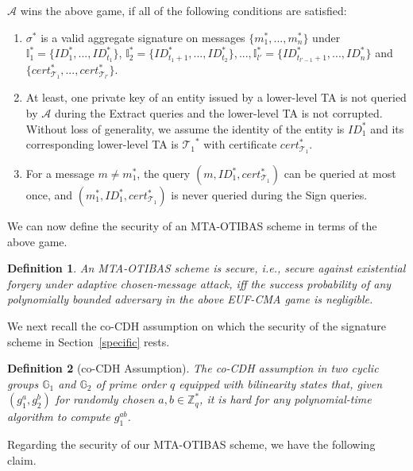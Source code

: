 \documentclass[10pt,journal,compsoc]{IEEEtran}
\newtheorem{definition}{Definition}
\begin{document}
\smallskip\noindent $\mathcal {A}$ wins the above game, if all of the
following conditions are satisfied:
\begin{enumerate}
  \item $\sigma^*$ is a valid aggregate signature on messages $\{m_1^*,...,m_n^*\}$
     under $\mathbb{I}_1^*=\{ID_1^*,...,ID_{t_1}^*\}$,
$\mathbb{I}_2^*=\{ID_{t_1+1}^*,...,ID_{t_2}^*\}
,...,\mathbb{I}_{l'}^*=\{ID_{t_{l'-1}+1}^*,...,ID_n^*\}$ and
$\{cert_{\mathcal{T}_1}^*,...,cert_{\mathcal{T}_{l'}}^*\}$.

  \item At least, one
    private key of an entity issued by a lower-level TA is not queried by $\mathcal {A}$ during the {\sf Extract}
  queries and the lower-level TA is not corrupted. Without loss of generality,
  we assume the identity of the entity is
  $ID_1^*$ and its corresponding lower-level TA is
  ${\mathcal{T}_1}^*$ with certificate
  $cert_{\mathcal{T}_1}^*$.

  \item For a message $m\neq m_1^*$, the query $(m, ID_1^*,cert_{\mathcal{T}_1}^*)$
   can be queried at most once,
  and $(m_1^*, ID_1^*,cert_{\mathcal{T}_1}^*)$ is never queried during the {\sf Sign} queries.
\end{enumerate}

We can now define the security of an MTA-OTIBAS scheme in terms of the
above game.

\begin{definition} An MTA-OTIBAS scheme is secure, i.e., secure against existential forgery
under adaptive chosen-message attack, iff the success probability of
any polynomially bounded adversary in the above EUF-CMA game is
negligible.
\end{definition}

We next recall the co-CDH assumption on which the security of the
signature scheme in Section~\ref{specific} rests.

\begin{definition}[co-CDH Assumption]
The co-CDH assumption in two cyclic groups $\mathbb{G}_1$ and
$\mathbb{G}_2$ of prime order $q$ equipped with bilinearity states
that, given $(g_1^a,g_2^b)$ for randomly chosen $a,b\in \mathbb{Z}_q^*$, it
is hard for any polynomial-time algorithm to compute $g_1^{ab}$.
\end{definition}

Regarding the security of our MTA-OTIBAS scheme, we have the following
claim.
\end{document}

